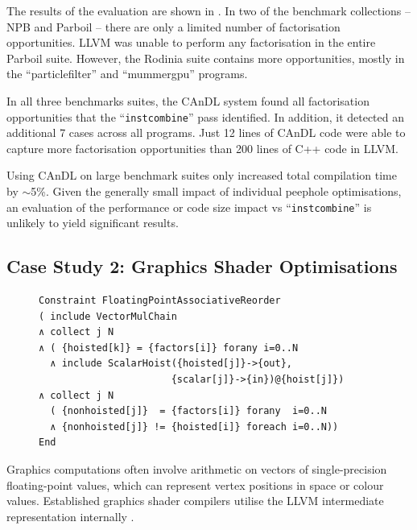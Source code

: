    The results of the evaluation are shown in
    .
    In two of the benchmark collections -- NPB and Parboil -- there are
    only a limited number of factorisation opportunities.
    LLVM was unable to perform any factorisation in the entire Parboil suite.
    However, the Rodinia suite contains more opportunities, mostly in the
    ``particlefilter'' and ``mummergpu'' programs.

    In all three benchmarks suites, the CAnDL system found all factorisation
    opportunities that the ``{\tt instcombine}'' pass identified.
    In addition, it detected an additional 7 cases across all programs.
    Just 12 lines of CAnDL code were able to capture more factorisation
    opportunities than 200 lines of C++ code in LLVM.

    Using CAnDL on large benchmark suites only increased total compilation time
    by $\sim$5\%.
    Given the generally small impact of individual peephole optimisations, an
    evaluation of the performance or code size impact vs ``{\tt instcombine}''
    is unlikely to yield significant results.

\subsection{Case Study 2: Graphics Shader Optimisations}

\begin{figure}[t]
\begin{lstlisting}[language=CAnDL,label={fig:Lewis},caption=
   {CAnDL defines multiplication chains with genuine vectors and hoisted
    scalars:
    After separating the two cases, some of the multiplications can be performed
    on scalars instead.}]
Constraint FloatingPointAssociativeReorder
( include VectorMulChain
∧ collect j N
∧ ( {hoisted[k]} = {factors[i]} forany i=0..N
  ∧ include ScalarHoist({hoisted[j]}->{out},
                       {scalar[j]}->{in})@{hoist[j]})
∧ collect j N
  ( {nonhoisted[j]}  = {factors[i]} forany  i=0..N
  ∧ {nonhoisted[j]} != {hoisted[i]} foreach i=0..N))
End
\end{lstlisting}
\end{figure}

    Graphics computations often involve arithmetic on vectors of
    single-precision floating-point values, which can represent vertex positions
    in space or colour values.
    Established graphics shader compilers utilise the LLVM intermediate
    representation internally \citep{cudacompiler}.

